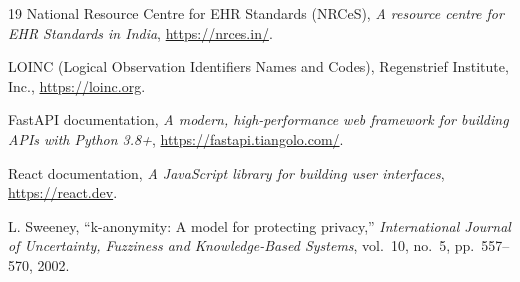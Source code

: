 \documentclass[12pt,a4paper]{report}
\begin{document}
\begin{thebibliography}{19}
National Resource Centre for EHR Standards (NRCeS), \textit{A resource centre for
EHR Standards in India}, \url{https://nrces.in/}.

LOINC (Logical Observation Identifiers Names and Codes), Regenstrief Institute, Inc.,
\url{https://loinc.org}.

FastAPI documentation, \textit{A modern, high-performance web framework for building
APIs with Python 3.8+}, \url{https://fastapi.tiangolo.com/}.

React documentation, \textit{A JavaScript library for building user interfaces},
\url{https://react.dev}.

L. Sweeney, ``k-anonymity: A model for protecting privacy,'' \textit{International
Journal of Uncertainty, Fuzziness and Knowledge-Based Systems}, vol.~10, no.~5,
pp.~557--570, 2002.

\end{thebibliography}
\end{document}
